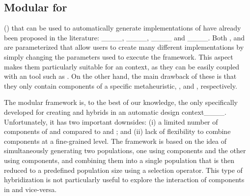 
\subsection{Modular \msfs for \algInPaper}
\Msfs (\MSFs) that can be used to automatically generate implementations of \algInPaper have already been proposed in the literature: \PSOX____, \aCMAES____, \aDE____ and \modPSODE____. %
Both \PSOX, \aCMAES and \aDE are parameterized \MSFs that allow users to create many different implementations by simply changing the parameters used to execute the framework. 
This aspect makes them particularly suitable for an \ad context, as they can be easily coupled with an \AACT tool such as \irace.
On the other hand, the main drawback of these \MSFs is that they only contain components of a specific metaheuristic, \PSO, \CMAES and \DE, respectively.

The modular \modPSODE framework is, to the best of our knowledge, the only \MSF specifically developed for creating \PSO and \DE hybrids in an automatic design context____.
Unfortunately, it has two important downsides: (i) a limited number of components of \PSO and \DE compared to \PSOX and \aDE; and (ii) lack of flexibility to combine components at a fine-grained level.
The \modPSODE framework is based on the idea of simultaneously generating two populations, one using \PSO components and the other using \DE components, and combining them into a single population that is then reduced to a predefined population size using a selection operator.
This type of hybridization is not particularly useful to explore the interaction of \PSO components in \DE and vice-versa.%
